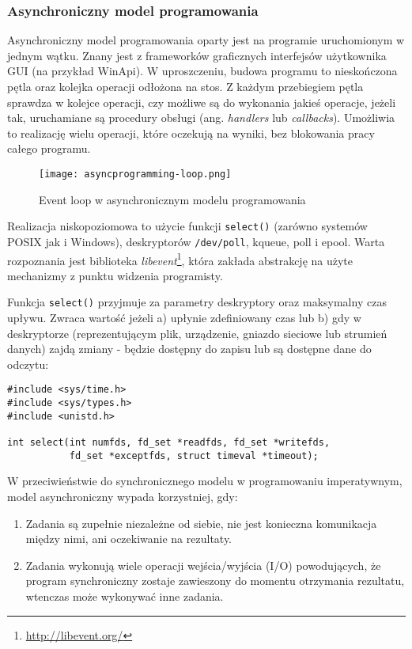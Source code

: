\subsubsection{Asynchroniczny model programowania}
\label{subsub:asyncprogramming}

Asynchroniczny model programowania oparty jest na programie uruchomionym w jednym wątku. Znany jest z frameworków graficznych interfejsów użytkownika GUI (na przykład WinApi). W uproszczeniu, budowa programu to nieskończona pętla oraz kolejka operacji odłożona na stos. Z każdym przebiegiem pętla sprawdza w kolejce operacji, czy możliwe są do wykonania jakieś operacje, jeżeli tak, uruchamiane są procedury obsługi (ang. \emph{handlers} lub \emph{callbacks}). Umożliwia to realizację wielu operacji, które oczekują na wyniki, bez blokowania pracy całego programu.

\begin{figure}[H]
  \caption[Event loop w asynchronicznym modelu programowania]{Event loop w asynchronicznym modelu programowania}
  \centering
    \texttt{[image: asyncprogramming-loop.png]}
\end{figure}

Realizacja niskopoziomowa to użycie funkcji \lstinline{select()} (zarówno systemów POSIX jak i Windows), deskryptorów \lstinline{/dev/poll}, kqueue, poll i epool. Warta rozpoznania jest biblioteka \emph{libevent}\footnote{\url{http://libevent.org/}}, która zakłada abstrakcję na użyte mechanizmy z punktu widzenia programisty\cite{programming-async-sockets}.

Funkcja \lstinline{select()} przyjmuje za parametry deskryptory oraz maksymalny czas upływu. Zwraca wartość jeżeli a) upłynie zdefiniowany czas lub b) gdy w deskryptorze (reprezentującym plik, urządzenie, gniazdo sieciowe lub strumień danych) zajdą zmiany - będzie dostępny do zapisu lub są dostępne dane do odczytu:

\lstset{language=C}
\begin{lstlisting}
#include <sys/time.h>
#include <sys/types.h>
#include <unistd.h>

int select(int numfds, fd_set *readfds, fd_set *writefds,
           fd_set *exceptfds, struct timeval *timeout);
\end{lstlisting}

W przeciwieństwie do synchronicznego modelu w programowaniu imperatywnym, model asynchroniczny wypada korzystniej, gdy\cite{programming-async}:

\begin{enumerate}
  \item Zadania są zupełnie niezależne od siebie, nie jest konieczna komunikacja między nimi, ani oczekiwanie na rezultaty.
  \item Zadania wykonują wiele operacji wejścia/wyjścia (I/O) powodujących, że program synchroniczny zostaje zawieszony do momentu otrzymania rezultatu, wtenczas może wykonywać inne zadania.
\end{enumerate}

